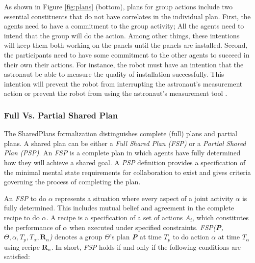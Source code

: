 \documentclass[12pt]{report}
\begin{document}
As shown in Figure \ref{fig:plans} (bottom), plans for group actions include two
essential constituents that do not have correlates in the individual plan.
First, the agents need to have a commitment to the group activity; All the
agents need to intend that the group will do the action. {\color{red}{For
instance, when a robot and an astronaut are collaborating to install a solar
panel, they need to have intentions to install the solar panel together.}} Among
other things, these intentions will keep them both working on the panels until
the panels are installed. Second, the participants need to have some commitment
to the other agents to succeed in their own their actions. For instance, the
robot must have an intention that the astronaut be able to measure the quality
of installation successfully. This intention will prevent the robot from
interrupting the astronaut's measurement action or prevent the robot from using
the astronaut's measurement tool \cite{grosz:collaborative-systems,
grosz:plans-discourse}.

\subsubsection{Full Vs. Partial Shared Plan}
\label{sec:full-partial-plan}

The SharedPlans formalization distinguishes complete (full) plans and partial
plans. A shared plan can be either a \textit{Full Shared Plan (FSP)} or a
\textit{Partial Shared Plan (PSP)}. An \textit{FSP} is a complete plan in which
agents have fully determined how they will achieve a shared goal. A \textit{PSP}
definition provides a specification of the minimal mental state requirements for
collaboration to exist and gives criteria governing the process of completing
the plan.

An \textit{FSP} to do $\alpha$ represents a situation where every aspect of a
joint activity $\alpha$ is fully determined. This includes mutual belief and
agreement in the complete recipe to do $\alpha$. A recipe is a specification of
a set of actions \textit{$A_i$}, which constitutes the performance of $\alpha$
when executed under specified constraints. \textit{FSP(\textbf{P}, $\Theta,
\alpha, T_p, T_\alpha, \textbf{R}_\alpha$)} denotes a group $\Theta$'s plan
\textit{\textbf{P}} at time \textit{$T_p$} to do action $\alpha$ at time
\textit{$T_\alpha$} using recipe \textit{$\textbf{R}_\alpha$}. In short,
\textit{FSP} holds if and only if the following conditions are satisfied:
\end{document}
